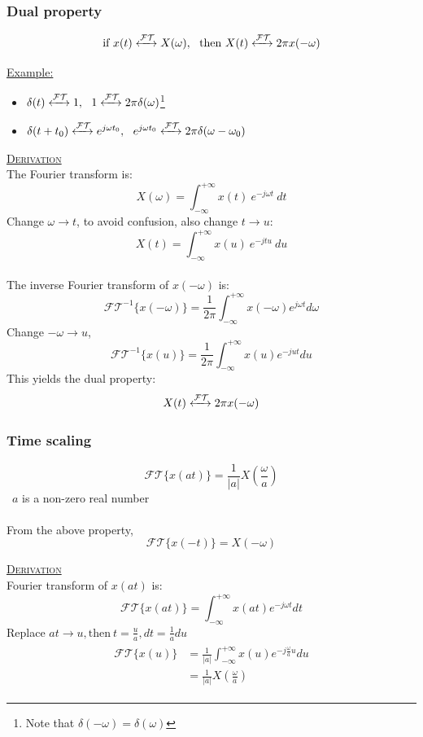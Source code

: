\documentclass[12pt,a4paper]{article}
\begin{document}
\subsubsection{Dual property}
\[ \text{if} \ x(t) \xleftrightarrow{\mathcal{FT}} X(\omega), \ \ \text{then} \ X(t) \xleftrightarrow{\mathcal{FT}} 2\pi x(-\omega) \]

\underline{Example:} 
\begin{itemize}
\item $\delta(t) \xleftrightarrow{\mathcal{FT}} 1, \ \ 1 \xleftrightarrow{\mathcal{FT}} 2\pi\delta(\omega)$\footnote{Note that $\delta(-\omega)=\delta(\omega)$}
\item $\delta(t+t_{0})\xleftrightarrow{\mathcal{FT}}e^{j\omega t_{0}}, \ \ e^{j\omega t_{0}} \xleftrightarrow{\mathcal{FT}} 2\pi \delta(\omega-\omega_{0})$
\end{itemize}

\begin{tcolorbox}[breakable]
\underline{\textsc{Derivation}}\\
The Fourier transform is:
\[ X(\omega) =  \int_{-\infty}^{+\infty} x(t) \ e^{-j \omega t} \ dt\] 
Change $\omega \to t$, to avoid confusion, also change $t \to u$:
\[ X(t) =  \int_{-\infty}^{+\infty} x(u) \ e^{-j t u} \ du \] \ \\
The inverse Fourier transform of $x(-\omega)$ is:
\[ \mathcal{FT}^{-1} \{ x(-\omega) \} = \frac{1}{2\pi} \int_{-\infty}^{+\infty} x(-\omega)e^{j \omega t} d\omega \]
Change $-\omega \to u$,
\[ \mathcal{FT}^{-1} \{ x(u) \} = \frac{1}{2\pi} \int_{-\infty}^{+\infty} x(u)e^{-jut} du \]
This yields the dual property:
\[ X(t) \xleftrightarrow{\mathcal{FT}} 2\pi x(-\omega) \]
\end{tcolorbox}

\subsubsection{Time scaling} 
\[ \mathcal{FT} \{ x(at) \} = \frac{1}{\lvert a \rvert}X(\frac{\omega}{a}) \]
\ $a$ is a non-zero real number\\\\
From the above property,
\[ \mathcal{FT} \{ x(-t) \} = X(-\omega) \]
\begin{tcolorbox}[breakable]
\underline{\textsc{Derivation}}\\
Fourier transform of $x(at)$ is:
\[ \mathcal{FT}\{x(at)\} =  \int_{-\infty}^{+\infty} x(at) e^{-j\omega t}dt \]
Replace $at \to u, \text{then} \ t = \frac{u}{a}, dt = \frac{1}{a} du$
\begin{align*}
\begin{split}
\mathcal{FT}\{x(u)\} &= \frac{1}{\lvert a \rvert} \int_{-\infty}^{+\infty} x(u) e^{-j \frac{\omega}{a}u}du\\
&= \frac{1}{\lvert a \rvert} X(\frac{\omega}{a})
\end{split}
\end{align*} \end{tcolorbox}
\end{document}

